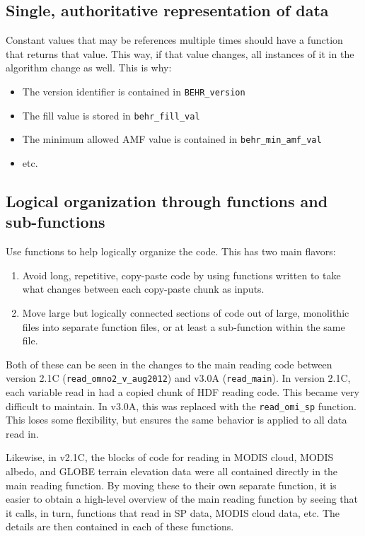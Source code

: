 \documentclass[12pt]{article}
\begin{document}
\subsection{Single, authoritative representation of data}
	Constant values that may be references multiple times should have a function that returns that value. This way, if that value changes, all instances of it in the algorithm change as well. This is why:
	\begin{itemize}
	\item The version identifier is contained in \lstinline$BEHR_version$
	\item The fill value is stored in \lstinline$behr_fill_val$
	\item The minimum allowed AMF value is contained in \lstinline$behr_min_amf_val$
	\item etc.
	\end{itemize}
	
	
\subsection{Logical organization through functions and sub-functions}
	Use functions to help logically organize the code. This has two main flavors:	
	\begin{enumerate}
	\item Avoid long, repetitive, copy-paste code by using functions written to take what changes between each copy-paste chunk as inputs.
	\item Move large but logically connected sections of code out of large, monolithic files into separate function files, or at least a sub-function within the same file.
	\end{enumerate} 
	
	Both of these can be seen in the changes to the main reading code between version 2.1C (\lstinline$read_omno2_v_aug2012$) and v3.0A (\lstinline$read_main$). In version 2.1C, each variable read in had a copied chunk of HDF reading code. This became very difficult to maintain. In v3.0A, this was replaced with the \lstinline$read_omi_sp$ function. This loses some flexibility, but ensures the same behavior is applied to all data read in.
	
	Likewise, in v2.1C, the blocks of code for reading in MODIS cloud, MODIS albedo, and GLOBE terrain elevation data were all contained directly in the main reading function. By moving these to their own separate function, it is easier to obtain a high-level overview of the main reading function by seeing that it calls, in turn, functions that read in SP data, MODIS cloud data, etc. The details are then contained in each of these functions.
	
\end{document}

